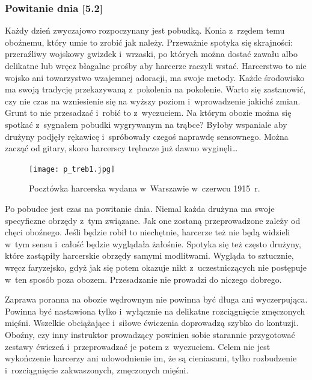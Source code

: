 \documentclass[a5paper,10pt,titlepage,twoside]{article}
\begin{document}
\subsubsection{Powitanie dnia [5.2]}
Każdy dzień zwyczajowo rozpoczynany jest pobudką. Konia z~rzędem temu oboźnemu, który umie to zrobić jak należy. Przeważnie spotyka się skrajności: przeraźliwy wojskowy gwizdek i~wrzaski, po których można dostać zawału albo delikatne lub wręcz błagalne prośby aby harcerze raczyli wstać. Harcerstwo to nie wojsko ani towarzystwo wzajemnej adoracji, ma swoje metody. Każde środowisko ma swoją tradycję przekazywaną z~pokolenia na pokolenie. Warto się zastanowić, czy nie czas na wzniesienie się na wyższy poziom i~wprowadzenie jakichś zmian. Grunt to nie przesadzać i~robić to z~wyczuciem. Na którym obozie można się spotkać z~sygnałem pobudki wygrywanym na trąbce? Byłoby wspaniale aby drużyny podjęły rękawicę i~spróbowały czegoś naprawdę sensownego. Można zacząć od gitary, skoro harcerscy trębacze już dawno wyginęli\ldots
\begin{figure}[htp]
\centering
\texttt{[image: p\_treb1.jpg]}
\caption[Cantin for LOP]{Pocztówka harcerska wydana w~Warszawie w~czerwcu 1915~r.\footnotemark}\label{fig:trebacz}
\end{figure}

Po pobudce jest czas na powitanie dnia. Niemal każda drużyna ma swoje specyficzne obrzędy z~tym związane. Jak one zostaną przeprowadzone zależy od chęci oboźnego. Jeśli będzie robił to niechętnie, harcerze też nie będą widzieli w~tym sensu i~całość będzie wyglądała żałośnie. Spotyka się też często drużyny, które zastąpiły harcerskie obrzędy samymi modlitwami. Wygląda to sztucznie, wręcz faryzejsko, gdyż jak się potem okazuje nikt z~uczestniczących nie postępuje w~ten sposób poza obozem. Przesadzanie nie prowadzi do niczego dobrego.

Zaprawa poranna na obozie wędrownym nie powinna być długa ani wyczerpująca. Powinna być nastawiona tylko i~wyłącznie na delikatne rozciągnięcie zmęczonych mięśni. Wszelkie obciążające i~siłowe ćwiczenia doprowadzą szybko do kontuzji. Oboźny, czy inny instruktor prowadzący powinien sobie starannie przygotować zestawy ćwiczeń i~przeprowadzać je potem z~wyczuciem. Celem nie jest wykończenie harcerzy ani udowodnienie im, że są cieniasami, tylko rozbudzenie i~rozciągnięcie zakwaszonych, zmęczonych mięśni.
\end{document}
